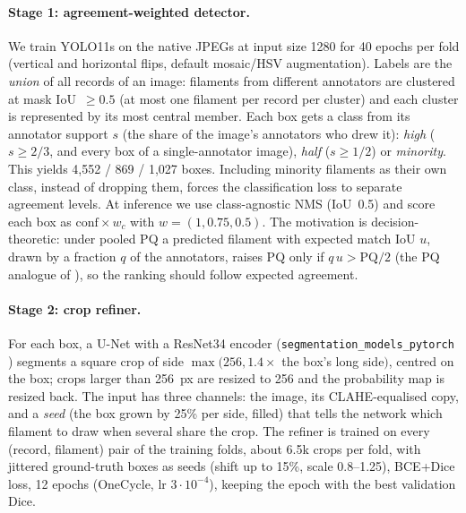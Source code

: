 \documentclass[sigconf]{acmart}
\begin{document}
\paragraph{Stage 1: agreement-weighted detector.} We train YOLO11s \cite{yolo11_ultralytics} on the native JPEGs at input size 1280 for 40 epochs per fold (vertical and horizontal flips, default mosaic/HSV augmentation). Labels are the \emph{union} of all records of an image: filaments from different annotators are clustered at mask IoU~$\geq 0.5$ (at most one filament per record per cluster) and each cluster is represented by its most central member. Each box gets a class from its annotator support $s$ (the share of the image's annotators who drew it): \emph{high} ($s\geq 2/3$, and every box of a single-annotator image), \emph{half} ($s\geq 1/2$) or \emph{minority}. This yields 4{,}552 / 869 / 1{,}027 boxes. Including minority filaments as their own class, instead of dropping them, forces the classification loss to separate agreement levels. At inference we use class-agnostic NMS (IoU~0.5) and score each box as $\mathrm{conf}\times w_c$ with $w=(1, 0.75, 0.5)$. The motivation is decision-theoretic: under pooled PQ a predicted filament with expected match IoU $u$, drawn by a fraction $q$ of the annotators, raises PQ only if $q\,u > \mathrm{PQ}/2$ (the PQ analogue of \cite{lipton2014thresholding}), so the ranking should follow expected agreement.

\paragraph{Stage 2: crop refiner.} For each box, a U-Net \cite{ronneberger2015unet} with a ResNet34 encoder \cite{he2016resnet} (\texttt{segmentation\_models\_pytorch} \cite{iakubovskii2019smp}) segments a square crop of side $\max(256, 1.4\times$ the box's long side$)$, centred on the box; crops larger than 256~px are resized to 256 and the probability map is resized back. The input has three channels: the image, its CLAHE-equalised copy, and a \emph{seed} (the box grown by 25\% per side, filled) that tells the network which filament to draw when several share the crop. The refiner is trained on every (record, filament) pair of the training folds, about 6.5k crops per fold, with jittered ground-truth boxes as seeds (shift up to 15\%, scale 0.8--1.25), BCE+Dice loss, 12 epochs (OneCycle, lr $3{\cdot}10^{-4}$), keeping the epoch with the best validation Dice.
\end{document}
